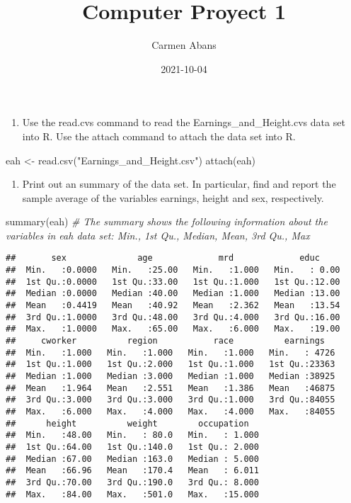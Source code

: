 \documentclass[
]{article}
\title{Computer Proyect 1}
\author{Carmen Abans}
\date{2021-10-04}
\newenvironment{Shaded}{\begin{snugshade}}{\end{snugshade}}
\newcommand{\CommentTok}[1]{\textcolor[rgb]{0.56,0.35,0.01}{\textit{#1}}}
\newcommand{\FunctionTok}[1]{\textcolor[rgb]{0.00,0.00,0.00}{#1}}
\newcommand{\NormalTok}[1]{#1}
\newcommand{\OtherTok}[1]{\textcolor[rgb]{0.56,0.35,0.01}{#1}}
\newcommand{\StringTok}[1]{\textcolor[rgb]{0.31,0.60,0.02}{#1}}
\providecommand{\tightlist}{%
  \setlength{\itemsep}{0pt}\setlength{\parskip}{0pt}}
\begin{document}
\maketitle

\begin{enumerate}
\def\labelenumi{\alph{enumi})}
\tightlist
\item
  Use the read.cvs command to read the Earnings\_and\_Height.cvs data
  set into R. Use the attach command to attach the data set into R.
\end{enumerate}

\begin{Shaded}
\begin{Highlighting}[]
\NormalTok{eah }\OtherTok{\textless{}{-}} \FunctionTok{read.csv}\NormalTok{(}\StringTok{"Earnings\_and\_Height.csv"}\NormalTok{)}
\FunctionTok{attach}\NormalTok{(eah)}
\end{Highlighting}
\end{Shaded}

\begin{enumerate}
\def\labelenumi{\alph{enumi})}
\setcounter{enumi}{1}
\tightlist
\item
  Print out an summary of the data set. In particular, find and report
  the sample average of the variables earnings, height and sex,
  respectively.
\end{enumerate}

\begin{Shaded}
\begin{Highlighting}[]
\FunctionTok{summary}\NormalTok{(eah)      }\CommentTok{\# The summary shows the following information about the variables in eah data set: Min., 1st Qu., Median, Mean, 3rd Qu., Max}
\end{Highlighting}
\end{Shaded}

\begin{verbatim}
##       sex              age             mrd             educ      
##  Min.   :0.0000   Min.   :25.00   Min.   :1.000   Min.   : 0.00  
##  1st Qu.:0.0000   1st Qu.:33.00   1st Qu.:1.000   1st Qu.:12.00  
##  Median :0.0000   Median :40.00   Median :1.000   Median :13.00  
##  Mean   :0.4419   Mean   :40.92   Mean   :2.362   Mean   :13.54  
##  3rd Qu.:1.0000   3rd Qu.:48.00   3rd Qu.:4.000   3rd Qu.:16.00  
##  Max.   :1.0000   Max.   :65.00   Max.   :6.000   Max.   :19.00  
##     cworker          region           race          earnings    
##  Min.   :1.000   Min.   :1.000   Min.   :1.000   Min.   : 4726  
##  1st Qu.:1.000   1st Qu.:2.000   1st Qu.:1.000   1st Qu.:23363  
##  Median :1.000   Median :3.000   Median :1.000   Median :38925  
##  Mean   :1.964   Mean   :2.551   Mean   :1.386   Mean   :46875  
##  3rd Qu.:3.000   3rd Qu.:3.000   3rd Qu.:1.000   3rd Qu.:84055  
##  Max.   :6.000   Max.   :4.000   Max.   :4.000   Max.   :84055  
##      height          weight        occupation    
##  Min.   :48.00   Min.   : 80.0   Min.   : 1.000  
##  1st Qu.:64.00   1st Qu.:140.0   1st Qu.: 2.000  
##  Median :67.00   Median :163.0   Median : 5.000  
##  Mean   :66.96   Mean   :170.4   Mean   : 6.011  
##  3rd Qu.:70.00   3rd Qu.:190.0   3rd Qu.: 8.000  
##  Max.   :84.00   Max.   :501.0   Max.   :15.000
\end{verbatim}
\end{document}
